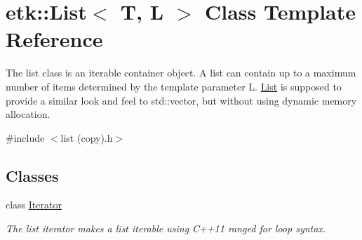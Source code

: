 \hypertarget{classetk_1_1_list}{\section{etk\-:\-:List$<$ T, L $>$ Class Template Reference}
\label{classetk_1_1_list}
}


The list class is an iterable container object. A list can contain up to a maximum number of items determined by the template parameter L. \hyperlink{classetk_1_1_list}{List} is supposed to provide a similar look and feel to std\-::vector, but without using dynamic memory allocation.  




{\ttfamily \#include $<$list (copy).\-h$>$}

\subsection*{Classes}
\begin{DoxyCompactItemize}
\item 
class \hyperlink{classetk_1_1_list_1_1_iterator}{Iterator}
\begin{DoxyCompactList}\small\item\em The list iterator makes a list iterable using C++11 ranged for loop syntax. \end{DoxyCompactList}\end{DoxyCompactItemize}
